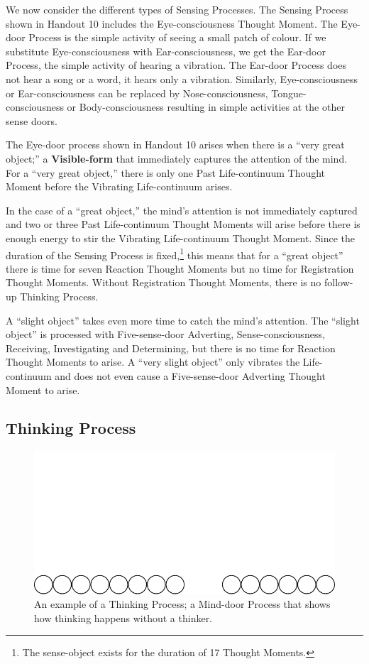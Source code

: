We now consider the different types of Sensing Processes. The Sensing Process shown in Handout 10 includes the Eye-consciousness Thought Moment. The Eye-door Process is the simple activity of seeing a small patch of colour. If we substitute Eye-consciousness with Ear-consciousness, we get the Ear-door Process, the simple activity of hearing a vibration. The Ear-door Process does not hear a song or a word, it hears only a vibration. Similarly, Eye-consciousness or Ear-consciousness can be replaced by Nose-consciousness, Tongue-consciousness or Body-consciousness resulting in simple activities at the other sense doors.

The Eye-door process shown in Handout 10 arises when there is a “very great object;” a \textbf{Visible-form} that immediately captures the attention of the mind. For a “very great object,” there is only one Past Life-continuum Thought Moment before the Vibrating Life-continuum arises. 

In the case of a “great object,” the mind’s attention is not immediately captured and two or three Past Life-continuum Thought Moments will arise before there is enough energy to stir the Vibrating Life-continuum Thought Moment. Since the duration of the Sensing Process is fixed,\footnote{The sense-object exists for the duration of 17 Thought Moments.} this means that for a “great object” there is time for seven Reaction Thought Moments but no time for Registration Thought Moments. Without Registration Thought Moments, there is no follow-up Thinking Process.

A “slight object” takes even more time to catch the mind’s attention. The “slight object” is processed with Five-sense-door Adverting, Sense-consciousness, Receiving, Investigating and Determining, but there is no time for Reaction Thought Moments to arise. A “very slight object” only vibrates the Life-continuum and does not even cause a Five-sense-door Adverting Thought Moment to arise.

\subsection*{Thinking Process}

\begin{figure}[h]
\centering
\includegraphics[width=0.8\linewidth]{./Diagrams/Process2}
\caption{An example of a Thinking Process; a Mind-door Process that shows how thinking happens without a thinker.}
\label{fig:Process2}
\end{figure}


